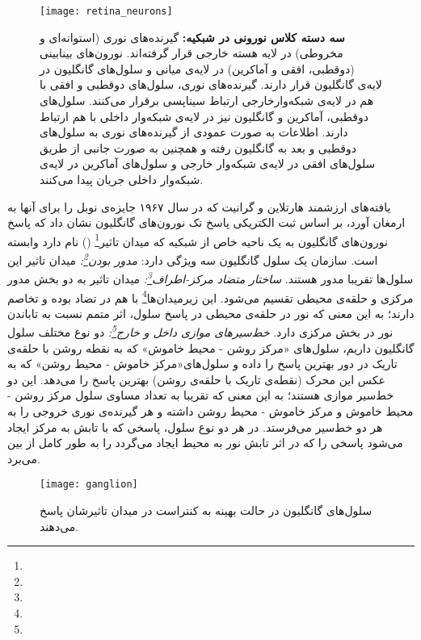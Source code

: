 \begin{figure}
\centering
{\footnotesize
\texttt{[image: retina\_neurons]}
\caption[سه دسته کلاس نورونی در شبکیه]{\textbf{سه دسته کلاس نورونی در شبکیه:} گیرنده‌های نوری (استوانه‌ای و مخروطی) در لایه هسته خارجی قرار گرفته‌اند. نورون‌های بینابینی (دوقطبی، افقی و آماکرین) در لایه‌ی میانی و سلول‌های گانگلیون در لایه‌ی گانگلیون قرار دارند. گیرنده‌های نوری، سلول‌های دوقطبی و افقی با هم در لایه‌ی شبکه‌وارخارجی ارتباط سیناپسی برقرار می‌کنند. سلول‌های دوقطبی، آماکرین و گانگلیون نیز در لایه‌ی شبکه‌وار داخلی با هم ارتباط دارند. اطلاعات به صورت عمودی از گیرنده‌های نوری به سلول‌های دوقطبی و بعد به گانگلیون رفته و همچنین به صورت جانبی از طریق سلول‌های افقی در لایه‌ی شبکه‌وار خارجی و سلول‌های آماکرین در لایه‌ی شبکه‌وار داخلی جریان پیدا می‌کنند.\cite{kandel2000principles}}
\label{fig:retina_neurons}
}
\end{figure}

یافته‌های ارزشمند هارتلاین و گرانیت\cite{hartline1938response} که در سال ۱۹۶۷ جایزه‌ی نوبل را برای آنها به ارمغان آورد، بر اساس ثبت الکتریکی پاسخ تک نورون‌های گانگلیون نشان داد که پاسخ نورون‌های گانگلیون به یک ناحیه خاص از شبکیه که میدان تاثیر\footnote{} () نام دارد وابسته است. سازمان  یک سلول گانگلیون سه ویژگی دارد: \textit{مدور بودن\footnote{}:} میدان تاثیر این سلول‌ها تقریبا مدور هستند. \textit{ساختار متضاد مرکز-اطراف\footnote{}:} میدان تاثیر به دو بخش مدور مرکزی و حلقه‌ی محیطی تقسیم می‌شود. این زیرمیدان‌ها\footnote{} با هم در تضاد بوده و تخاصم دارند؛ به این معنی که نور در حلقه‌ی محیطی در پاسخ سلول، اثر متمم نسبت به تاباندن نور در بخش مرکزی دارد. \textit{خط‌سیر‌های موازی داخل و خارج\footnote{}:} دو نوع مختلف سلول گانگلیون داریم، سلول‌های «مرکز روشن - محیط خاموش» که به نقطه روشن با حلقه‌ی تاریک در دور بهترین پاسخ را داده و سلول‌های«مرکز خاموش - محیط روشن» که به عکس این محرک (نقطه‌ی تاریک با حلقه‌ی روشن) بهترین پاسخ را می‌دهد. این دو خط‌سیر موازی هستند؛ به این معنی که تقریبا به تعداد مساوی سلول مرکز روشن - محیط خاموش و مرکز خاموش - محیط روشن داشته و هر گیرنده‌ی نوری خروجی را به هر دو خط‌سیر می‌فرستد. در هر دو نوع سلول، پاسخی که با تابش به مرکز ایجاد می‌شود پاسخی را که در اثر تابش نور به محیط ایجاد می‌گردد را به طور کامل از بین می‌برد.

\begin{figure}
\centering
{\footnotesize
\texttt{[image: ganglion]}
\caption[پاسخ سلول‌های گانگلیون]{سلول‌های گانگلیون در حالت بهینه به کنتراست در میدان تاثیرشان پاسخ می‌دهند.\cite{kandel2000principles}}
\label{fig:ganglion}
}
\end{figure}

